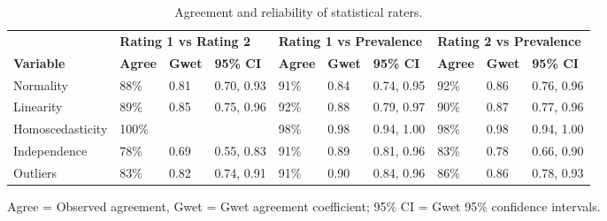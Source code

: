 \begin{table}[H]
\begin{widestuff}
\caption{Agreement and reliability of statistical raters.} 
\begin{flushleft}  \begin{tabular}{llllllllll}
  \toprule & \multicolumn{3}{l}{\textbf{Rating 1 vs Rating 2}} & \multicolumn{3}{l}{\textbf{Rating 1 vs Prevalence}} & \multicolumn{3}{l}{\textbf{Rating 2 vs Prevalence}} \\
\cline{2-10}
{\bf Variable} & {\bf Agree} & {\bf Gwet} & {\bf 95\% CI} & {\bf Agree} & {\bf Gwet} & {\bf 95\% CI} & {\bf Agree} & {\bf Gwet} & {\bf 95\% CI} \\ 
  \midrule
Normality & 88\% & 0.81 & 0.70, 0.93 & 91\% & 0.84 & 0.74, 0.95 & 92\% & 0.86 & 0.76, 0.96 \\ 
  Linearity & 89\% & 0.85 & 0.75, 0.96 & 92\% & 0.88 & 0.79, 0.97 & 90\% & 0.87 & 0.77, 0.96 \\ 
  Homoscedasticity & 100\% &   &   & 98\% & 0.98 & 0.94, 1.00 & 98\% & 0.98 & 0.94, 1.00 \\ 
  Independence & 78\% & 0.69 & 0.55, 0.83 & 91\% & 0.89 & 0.81, 0.96 & 83\% & 0.78 & 0.66, 0.90 \\ 
  Outliers & 83\% & 0.82 & 0.74, 0.91 & 91\% & 0.90 & 0.84, 0.96 & 86\% & 0.86 & 0.78, 0.93 \\ 
   \bottomrule
\end{tabular} \end{flushleft} \begin{flushleft}  Agree = Observed agreement, Gwet = Gwet agreement coefficient; 95\% CI = Gwet 95\% confidence intervals. \end{flushleft}
\end{widestuff}
\end{table}

